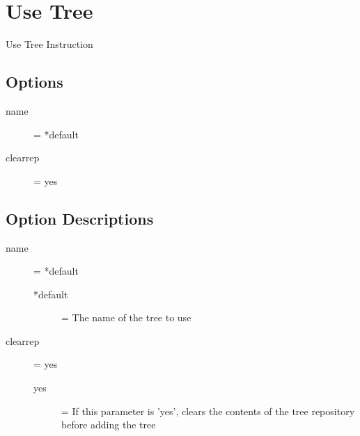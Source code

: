 \section{Use Tree}

Use Tree Instruction

\subsection{Options}
\begin{description}
\item[name] = *default
\item[clearrep] = yes
\end{description}

\subsection{Option Descriptions}
\begin{description}
\item[name] = *default
	\begin{description}
	\item[*default] = The name of the tree to use
	\end{description}
\item[clearrep] = yes
	\begin{description}
	\item[yes] = If this parameter is 'yes', clears the contents of the tree repository before adding the tree
	\end{description}
\end{description}

